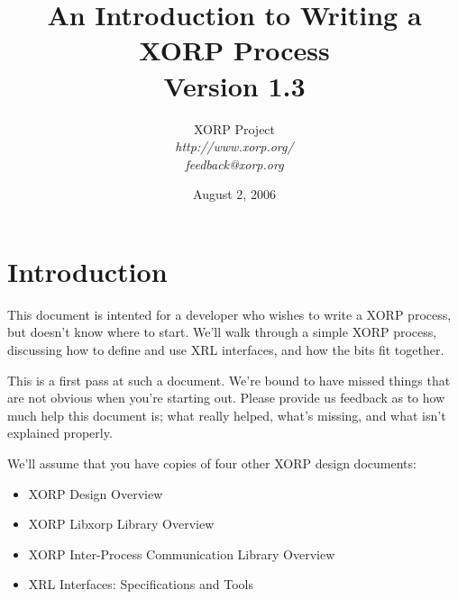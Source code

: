 \documentclass[11pt]{article}
\begin{document}
\title{An Introduction to Writing a XORP Process \\
\vspace{1ex}
Version 1.3}
\author{ XORP Project					\\
         {\it http://www.xorp.org/}			\\
	 {\it feedback@xorp.org}
}
\date{August 2, 2006}

\maketitle


%
%
\newcommand{\stt}{\tt\small}
\newcommand{\SR}{{\tt\small static\_routes}\xspace}
\newcommand{\SRI}{{\it static\_routes}\xspace}



\tableofcontents

\newpage

\section{Introduction}

This document is intented for a developer who wishes to write a XORP
process, but doesn't know where to start.  We'll walk through a simple
XORP process, discussing how to define and use XRL interfaces, and how
the bits fit together.  

This is a first pass at such a document.  We're bound to have missed
things that are not obvious when you're starting out.  Please provide
us feedback as to how much help this document is; what really helped,
what's missing, and what isn't explained properly.

We'll assume that you have copies of four other XORP design documents:

\begin{itemize}
  \item XORP Design Overview\cite{xorp:design_arch}
  \item XORP Libxorp Library Overview\cite{xorp:libxorp}
  \item XORP Inter-Process Communication Library Overview\cite{xorp:xrl}
  \item XRL Interfaces: Specifications and Tools\cite{xorp:xrl_interfaces}
\end{itemize}
\end{document}
